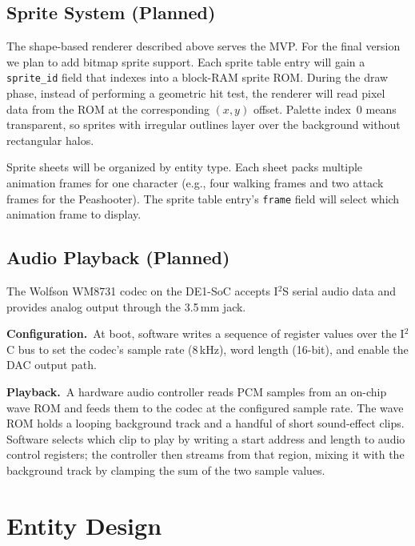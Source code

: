 \documentclass[11pt,letterpaper]{article}
\begin{document}
\subsection{Sprite System (Planned)}
\label{sec:algo-sprites}

The shape-based renderer described above serves the MVP. For the final
version we plan to add bitmap sprite support. Each sprite table entry
will gain a \texttt{sprite\_id} field that indexes into a block-RAM
sprite ROM. During the draw phase, instead of performing a geometric hit
test, the renderer will read pixel data from the ROM at the
corresponding $(x, y)$ offset. Palette index~0 means transparent, so
sprites with irregular outlines layer over the background without
rectangular halos.

Sprite sheets will be organized by entity type. Each sheet packs
multiple animation frames for one character (e.g., four walking frames
and two attack frames for the Peashooter). The sprite table entry's
\texttt{frame} field will select which animation frame to display.

\subsection{Audio Playback (Planned)}
\label{sec:algo-audio}

The Wolfson WM8731 codec on the DE1-SoC accepts I$^2$S serial audio
data and provides analog output through the 3.5\,mm jack.

\textbf{Configuration.}\ At boot, software writes a sequence of register
values over the I$^2$C bus to set the codec's sample rate (8\,kHz),
word length (16-bit), and enable the DAC output path.

\textbf{Playback.}\ A hardware audio controller reads PCM samples from
an on-chip wave ROM and feeds them to the codec at the configured sample
rate. The wave ROM holds a looping background track and a handful of
short sound-effect clips. Software selects which clip to play by writing
a start address and length to audio control registers; the controller
then streams from that region, mixing it with the background track by
clamping the sum of the two sample values.

\section{Entity Design}
\label{sec:entities}
\end{document}
